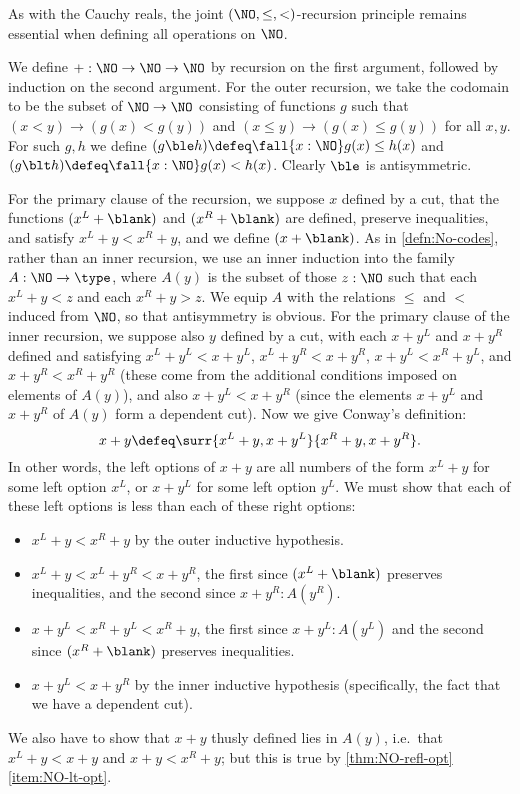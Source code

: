 As with the Cauchy reals, the joint $(\NO,\le,<)$-recursion principle remains essential when defining all operations on $\NO$.

\begin{eg}\label{eg:surreal-addition}
%
We define $\mathord+:\NO\to\NO\to\NO$ by recursion on the first argument, followed by induction on the second argument.
For the outer recursion, we take the codomain to be the subset of $\NO\to\NO$ consisting of functions $g$ such that $(x<y) \to (g(x)<g(y))$ and $(x\le y) \to (g(x)\le g(y))$ for all $x,y$.
For such $g,h$ we define $(g\ble h)\defeq \fall{x:\NO} g(x)\le h(x)$ and $(g\blt h)\defeq \fall{x:\NO} g(x)< h(x)$.
Clearly $\ble$ is antisymmetric.

For the primary clause of the recursion, we suppose $x$ defined by a cut, that the functions $(x^L+\blank)$ and $(x^R+\blank)$ are defined, preserve inequalities, and satisfy $x^L+y<x^R+y$, and we define $(x+\blank)$.
As in \cref{defn:No-codes}, rather than an inner recursion, we use an inner induction into the family $A:\NO\to\type$, where $A(y)$ is the subset of those $z:\NO$ such that each $x^L + y < z$ and each $x^R + y > z$.
We equip $A$ with the relations $\le$ and $<$ induced from $\NO$, so that antisymmetry is obvious.
For the primary clause of the inner recursion, we suppose also $y$ defined by a cut, with each $x+y^L$ and $x+y^R$ defined and satisfying $x^L+y^L < x+y^L$, $x^L+y^R < x+y^R$, $x+y^L < x^R + y^L$, and $x+y^R < x^R+y^R$ (these come from the additional conditions imposed on elements of $A(y)$), and also $x+y^L < x+y^R$ (since the elements $x+y^L$ and $x+y^R$ of $A(y)$ form a dependent cut).
Now we give Conway's definition:
\[ x+y \defeq \surr{x^L+y, x+y^L}{x^R+y,x+y^R}. \]
In other words, the left options of $x+y$ are all numbers of the form $x^L+y$ for some left option $x^L$, or $x+y^L$ for some left option $y^L$.
We must show that each of these left options is less than each of these right options:
\begin{itemize}
\item $x^L+y < x^R+y$ by the outer inductive hypothesis.
\item $x^L+y < x^L + y^R < x + y^R$, the first since $(x^L+\blank)$ preserves inequalities, and the second since $x+y^R : A(y^R)$.
\item $x+y^L < x^R+ y^L < x^R + y$, the first since $x+y^L : A(y^L)$ and the second since $(x^R+\blank)$ preserves inequalities.
\item $x+y^L < x+y^R$ by the inner inductive hypothesis (specifically, the fact that we have a dependent cut).
\end{itemize}
We also have to show that $x+y$ thusly defined lies in $A(y)$, i.e.\ that $x^L + y < x+y$ and $x+y < x^R + y$; but this is true by \cref{thm:NO-refl-opt}\ref{item:NO-lt-opt}.


\end{eg}
